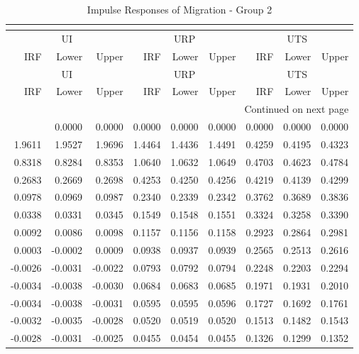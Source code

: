 \begin{longtable}{rrrrrrrrr}
\caption{Impulse Responses of Migration - Group 2}\\
\label{tab:mig_irf_group2}\\
\toprule
\multicolumn{3}{c}{UI} & \multicolumn{3}{c}{URP} & \multicolumn{3}{c}{UTS} \\
IRF & Lower & Upper & IRF & Lower & Upper & IRF & Lower & Upper \\
\midrule
\endfirsthead
\toprule
\multicolumn{3}{c}{UI} & \multicolumn{3}{c}{URP} & \multicolumn{3}{c}{UTS} \\
IRF & Lower & Upper & IRF & Lower & Upper & IRF & Lower & Upper \\
\midrule
\endhead
\midrule
\multicolumn{9}{r}{Continued on next page} \\
\midrule
\endfoot
\bottomrule
\endlastfoot
0.0000 & 0.0000 & 0.0000 & 0.0000 & 0.0000 & 0.0000 & 0.0000 & 0.0000 & 0.0000 \\
1.9611 & 1.9527 & 1.9696 & 1.4464 & 1.4436 & 1.4491 & 0.4259 & 0.4195 & 0.4323 \\
0.8318 & 0.8284 & 0.8353 & 1.0640 & 1.0632 & 1.0649 & 0.4703 & 0.4623 & 0.4784 \\
0.2683 & 0.2669 & 0.2698 & 0.4253 & 0.4250 & 0.4256 & 0.4219 & 0.4139 & 0.4299 \\
0.0978 & 0.0969 & 0.0987 & 0.2340 & 0.2339 & 0.2342 & 0.3762 & 0.3689 & 0.3836 \\
0.0338 & 0.0331 & 0.0345 & 0.1549 & 0.1548 & 0.1551 & 0.3324 & 0.3258 & 0.3390 \\
0.0092 & 0.0086 & 0.0098 & 0.1157 & 0.1156 & 0.1158 & 0.2923 & 0.2864 & 0.2981 \\
0.0003 & -0.0002 & 0.0009 & 0.0938 & 0.0937 & 0.0939 & 0.2565 & 0.2513 & 0.2616 \\
-0.0026 & -0.0031 & -0.0022 & 0.0793 & 0.0792 & 0.0794 & 0.2248 & 0.2203 & 0.2294 \\
-0.0034 & -0.0038 & -0.0030 & 0.0684 & 0.0683 & 0.0685 & 0.1971 & 0.1931 & 0.2010 \\
-0.0034 & -0.0038 & -0.0031 & 0.0595 & 0.0595 & 0.0596 & 0.1727 & 0.1692 & 0.1761 \\
-0.0032 & -0.0035 & -0.0028 & 0.0520 & 0.0519 & 0.0520 & 0.1513 & 0.1482 & 0.1543 \\
-0.0028 & -0.0031 & -0.0025 & 0.0455 & 0.0454 & 0.0455 & 0.1326 & 0.1299 & 0.1352 \\
\end{longtable}